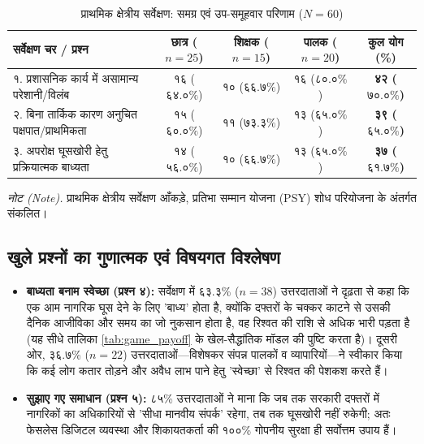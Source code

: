 \documentclass[11pt, a4paper]{article}
\begin{document}
\begin{table}[htbp]
\centering
\caption{प्राथमिक क्षेत्रीय सर्वेक्षण: समग्र एवं उप-समूहवार परिणाम ($N = 60$)}
\label{tab:survey_results}
\begin{tabular*}{\textwidth}{@{\extracolsep{\fill}}lcccc}
\toprule
\textbf{सर्वेक्षण चर / प्रश्न} & \textbf{छात्र ($n=25$)} & \textbf{शिक्षक ($n=15$)} & \textbf{पालक ($n=20$)} & \textbf{कुल योग (\%)} \\
\midrule
१. प्रशासनिक कार्य में असामान्य परेशानी/विलंब & १६ ($६४.०\%$) & १० ($६६.७\%$) & १६ ($८०.०\%$) & \textbf{४२ ($७०.०\%$)} \\
२. बिना तार्किक कारण अनुचित पक्षपात/प्राथमिकता & १५ ($६०.०\%$) & ११ ($७३.३\%$) & १३ ($६५.०\%$) & \textbf{३९ ($६५.०\%$)} \\
३. अपरोक्ष घूसखोरी हेतु प्रक्रियात्मक बाध्यता & १४ ($५६.०\%$) & १० ($६६.७\%$) & १३ ($६५.०\%$) & \textbf{३७ ($६१.७\%$)} \\
\bottomrule
\end{tabular*}
\vspace{0.2em}
\begin{flushleft}
\footnotesize \textit{नोट (Note).} प्राथमिक क्षेत्रीय सर्वेक्षण आँकड़े, प्रतिभा सम्मान योजना (PSY) शोध परियोजना के अंतर्गत संकलित।
\end{flushleft}
\end{table}

\subsection{खुले प्रश्नों का गुणात्मक एवं विषयगत विश्लेषण}
\begin{itemize}
    \item \textbf{बाध्यता बनाम स्वेच्छा (प्रश्न ४):} सर्वेक्षण में ६३.३\% ($n=38$) उत्तरदाताओं ने दृढ़ता से कहा कि एक आम नागरिक घूस देने के लिए 'बाध्य' होता है, क्योंकि दफ्तरों के चक्कर काटने से उसकी दैनिक आजीविका और समय का जो नुकसान होता है, वह रिश्वत की राशि से अधिक भारी पड़ता है (यह सीधे तालिका \ref{tab:game_payoff} के खेल-सैद्धांतिक मॉडल की पुष्टि करता है)। दूसरी ओर, ३६.७\% ($n=22$) उत्तरदाताओं---विशेषकर संपन्न पालकों व व्यापारियों---ने स्वीकार किया कि कई लोग कतार तोड़ने और अवैध लाभ पाने हेतु 'स्वेच्छा' से रिश्वत की पेशकश करते हैं।
    \item \textbf{सुझाए गए समाधान (प्रश्न ५):} ८५\% उत्तरदाताओं ने माना कि जब तक सरकारी दफ्तरों में नागरिकों का अधिकारियों से 'सीधा मानवीय संपर्क' रहेगा, तब तक घूसखोरी नहीं रुकेगी; अतः फेसलेस डिजिटल व्यवस्था और शिकायतकर्ता की १००\% गोपनीय सुरक्षा ही सर्वोत्तम उपाय हैं।
\end{itemize}
\end{document}
